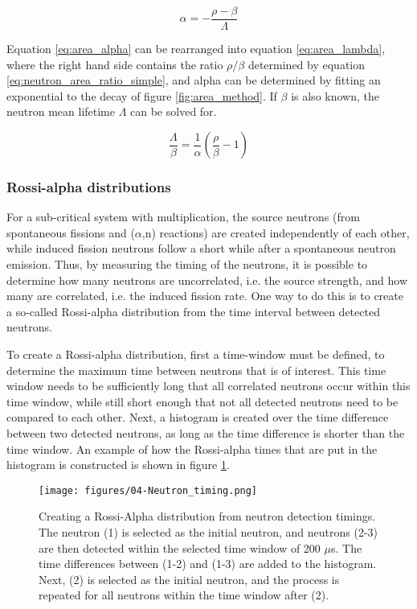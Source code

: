\begin{equation} \label{eq:area_alpha}
\alpha = - \frac{\rho - \beta}{\Lambda}
\end{equation} 

Equation \ref{eq:area_alpha} can be rearranged into equation \ref{eq:area_lambda}, where the right hand side contains the ratio $\rho/\beta$ determined by equation \ref{eq:neutron_area_ratio_simple}, and alpha can be determined by fitting an exponential to the decay of figure \ref{fig:area_method}. If $\beta$ is also known, the neutron mean lifetime $\Lambda$ can be solved for.

\begin{equation} \label{eq:area_lambda}
\frac{\Lambda}{\beta} = \frac{1}{\alpha}(\frac{\rho}{\beta}-1)
\end{equation} 

\subsubsection{Rossi-alpha distributions}

For a sub-critical system with multiplication, the source neutrons (from spontaneous fissions and ($\alpha$,n) reactions) are created independently of each other, while induced fission neutrons follow a short while after a spontaneous neutron emission. Thus, by measuring the timing of the neutrons, it is possible to determine how many neutrons are uncorrelated, i.e. the source strength, and how many are correlated, i.e. the induced fission rate. One way to do this is to create a so-called Rossi-alpha distribution from the time interval between detected neutrons. 

To create a Rossi-alpha distribution, first a time-window must be defined, to determine the maximum time between neutrons that is of interest. This time window needs to be sufficiently long that all correlated neutrons occur within this time window, while still short enough that not all detected neutrons need to be compared to each other. Next, a histogram is created over the time difference between two detected neutrons, as long as the time difference is shorter than the time window. An example of how the Rossi-alpha times that are put in the histogram is constructed is shown in figure \ref{fig:neutron_timing}.

\begin{figure} 
\centering
\texttt{[image: figures/04-Neutron\_timing.png]}
\caption[Area Method]{\label{fig:neutron_timing}
Creating a Rossi-Alpha distribution from neutron detection timings. The neutron (1) is selected as the initial neutron, and neutrons (2-3) are then detected within the selected time window of 200 $\mu$s. The time differences between (1-2) and (1-3) are added to the histogram. Next, (2) is selected as the initial neutron, and the process is repeated for all neutrons within the time window after (2).}
\end{figure}

